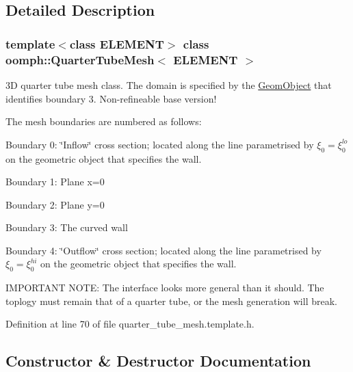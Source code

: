 \subsection{Detailed Description}
\subsubsection*{template$<$class E\+L\+E\+M\+E\+NT$>$\newline
class oomph\+::\+Quarter\+Tube\+Mesh$<$ E\+L\+E\+M\+E\+N\+T $>$}

3D quarter tube mesh class. The domain is specified by the \hyperlink{classoomph_1_1GeomObject}{Geom\+Object} that identifies boundary 3. Non-\/refineable base version! 

The mesh boundaries are numbered as follows\+:
\begin{DoxyItemize}
\item Boundary 0\+: \char`\"{}\+Inflow\char`\"{} cross section; located along the line parametrised by $ \xi_0 = \xi_0^{lo} $ on the geometric object that specifies the wall.
\item Boundary 1\+: Plane x=0
\item Boundary 2\+: Plane y=0
\item Boundary 3\+: The curved wall
\item Boundary 4\+: \char`\"{}\+Outflow\char`\"{} cross section; located along the line parametrised by $ \xi_0 = \xi_0^{hi} $ on the geometric object that specifies the wall.
\end{DoxyItemize}

I\+M\+P\+O\+R\+T\+A\+NT N\+O\+TE\+: The interface looks more general than it should. The toplogy must remain that of a quarter tube, or the mesh generation will break. 

Definition at line 70 of file quarter\+\_\+tube\+\_\+mesh.\+template.\+h.



\subsection{Constructor \& Destructor Documentation}
\mbox{\label{classoomph_1_1QuarterTubeMesh_a4dfb9a85b3c07d8bafa0f916c445c18a}} 
